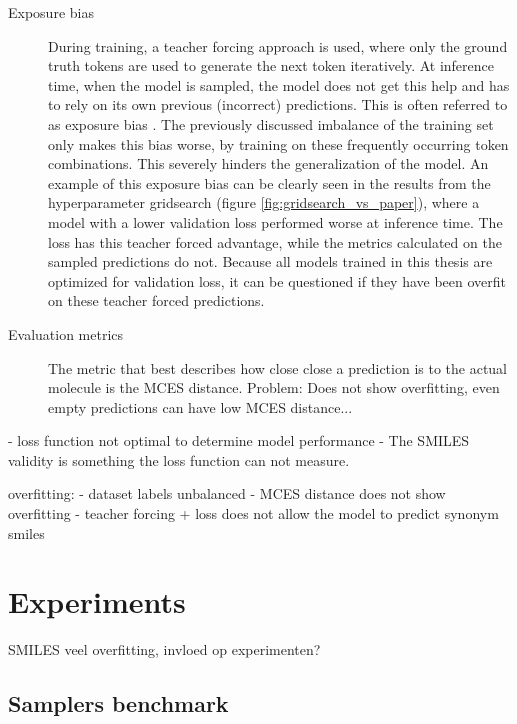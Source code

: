 \begin{description}
    \item[Exposure bias] During training, a teacher forcing approach is used, where only the ground truth tokens are used to generate the next token iteratively.
    At inference time, when the model is sampled, the model does not get this help and has to rely on its own previous (incorrect) predictions.
    This is often referred to as exposure bias \cite{schmidt2019generalization}.
    The previously discussed imbalance of the training set only makes this bias worse, by training on these frequently occurring token combinations.
    This severely hinders the generalization of the model.
    An example of this exposure bias can be clearly seen in the results from the hyperparameter gridsearch (figure \ref{fig:gridsearch_vs_paper}), where a model with a lower validation loss performed worse at inference time.
    The loss has this teacher forced advantage, while the metrics calculated on the sampled predictions do not.
    Because all models trained in this thesis are optimized for validation loss, it can be questioned if they have been overfit on these teacher forced predictions.
    
    \item[Evaluation metrics] The metric that best describes how close close a prediction is to the actual molecule is the \ac{MCES} distance.
    Problem: Does not show overfitting, even empty predictions can have low MCES distance...
\end{description}






- loss function not optimal to determine model performance
- The SMILES validity is something the loss function can not measure.

overfitting:
    - dataset labels unbalanced
    - MCES distance does not show overfitting
    - teacher forcing + loss does not allow the model to predict synonym smiles




\section{Experiments}

SMILES veel overfitting, invloed op experimenten?

\subsection{Samplers benchmark}

